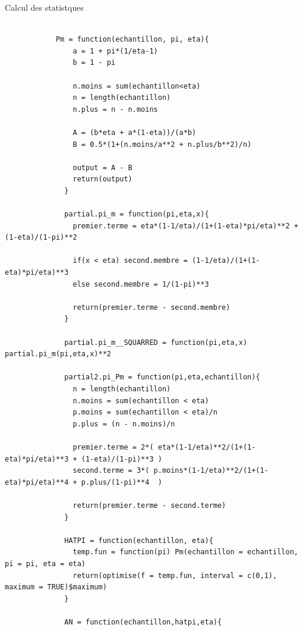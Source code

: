 \documentclass{article}
\begin{document}
    \begin{script}
        \caption{Calcul des statistques}
        \begin{verbatim}

            Pm = function(echantillon, pi, eta){
                a = 1 + pi*(1/eta-1)
                b = 1 - pi
                
                n.moins = sum(echantillon<eta)
                n = length(echantillon)
                n.plus = n - n.moins
                
                A = (b*eta + a*(1-eta))/(a*b)
                B = 0.5*(1+(n.moins/a**2 + n.plus/b**2)/n)
                
                output = A - B
                return(output)
              }
              
              partial.pi_m = function(pi,eta,x){
                premier.terme = eta*(1-1/eta)/(1+(1-eta)*pi/eta)**2 + (1-eta)/(1-pi)**2
                
                if(x < eta) second.membre = (1-1/eta)/(1+(1-eta)*pi/eta)**3
                else second.membre = 1/(1-pi)**3
              
                return(premier.terme - second.membre)
              }
              
              partial.pi_m__SQUARRED = function(pi,eta,x) partial.pi_m(pi,eta,x)**2
              
              partial2.pi_Pm = function(pi,eta,echantillon){
                n = length(echantillon)
                n.moins = sum(echantillon < eta)
                p.moins = sum(echantillon < eta)/n
                p.plus = (n - n.moins)/n
                
                premier.terme = 2*( eta*(1-1/eta)**2/(1+(1-eta)*pi/eta)**3 + (1-eta)/(1-pi)**3 )
                second.terme = 3*( p.moins*(1-1/eta)**2/(1+(1-eta)*pi/eta)**4 + p.plus/(1-pi)**4  ) 
                
                return(premier.terme - second.terme)
              }
              
              HATPI = function(echantillon, eta){
                temp.fun = function(pi) Pm(echantillon = echantillon, pi = pi, eta = eta)
                return(optimise(f = temp.fun, interval = c(0,1), maximum = TRUE)$maximum)
              } 
              
              AN = function(echantillon,hatpi,eta){
                

\end{verbatim}
\end{script}
\end{document}
